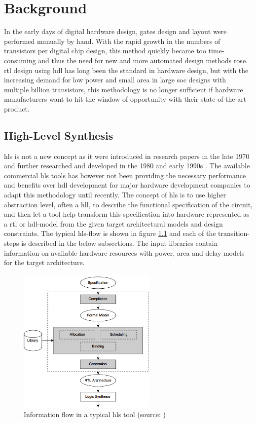\chapter{\label{chp:background}Background}
In the early days of digital hardware design, gates design and layout were performed manually by hand. With the rapid growth in the numbers of transistors per digital chip design, this method quickly became too time-consuming and thus the need for new and more automated design methods rose. \gls{rtl} design using \gls{hdl} has long been the standard in hardware design, but with the increasing demand for low power and small area in large \gls{soc} designs with multiple billion transistors, this methodology is no longer sufficient if hardware manufacturers want to hit the window of opportunity with their state-of-the-art product.

\section{\label{sec:hls}High-Level Synthesis}

\gls{hls} is not a new concept as it were introduced in research papers in the late 1970 and further researched and developed in the 1980 and early 1990s \cite{martin2009high}. The available commercial \gls{hls} tools has however not been providing the necessary performance and benefits over \gls{hdl} development for major hardware development companies to adapt this methodology until recently.
The concept of \gls{hls} is to use higher abstraction level, often a \gls{hll}, to describe the functional specification of the circuit, and then let a tool help transform this specification into hardware represented as a \gls{rtl} or \gls{hdl}-model from the given target architectural models and design constraints. The typical \gls{hls}-flow is shown in figure \ref{fig:hlsflow} and each of the transition-steps is described in the below subsections. The input libraries contain information on available hardware resources with power, area and delay models for the target architecture.

\begin{figure}[hbpt]
\centering
\includegraphics[width=0.6\textwidth]{../figs/HLSFlow.png}
\caption{\label{fig:hlsflow}Information flow in a typical \gls{hls} tool (source: \cite{coussy2009introduction})}
\end{figure}


